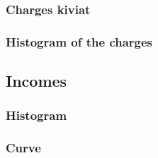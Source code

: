 \documentclass[8pt]{article} %
\begin{document}

\subsubsection{Charges kiviat}


%

\subsubsection{Histogram of the charges}



%

\subsection{Incomes}
%

%
\subsubsection{Histogram}

\subsubsection{Curve}



\end{document}
